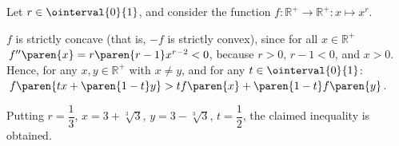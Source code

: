 Let $r \in \ointerval{0}{1}$,
and consider the function $f : \mathbb{R}^{+} \to \mathbb{R}^{+} : x \mapsto x^r$.

$f$ is strictly concave (that is, $-f$ is strictly convex),
since for all $x \in \mathbb{R}^{+}$
$\, f^{\prime\prime}\paren{x} = r \paren{r - 1} x^{r - 2} < 0$,
because $r > 0$, $r - 1 < 0$, and $x > 0$. \newline
Hence, for any $x, y \in \mathbb{R}^{+}$ with $x \neq y$,
and for any $t \in \ointerval{0}{1}$:
$\, f\paren{t x + \paren{1 - t} y} > t f\paren{x} + \paren{1 - t} f\paren{y}$.

Putting $r = \dfrac{1}{3}$, $x = 3 + \sqrt[3]{3}$, $y = 3 - \sqrt[3]{3}$, $t = \dfrac{1}{2}$,
the claimed inequality is obtained.
